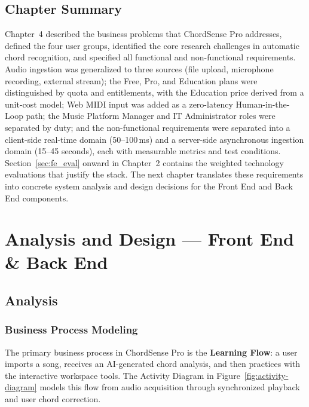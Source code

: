 \documentclass[a4paper]{article}
\begin{document}
\subsection{Chapter Summary}

Chapter~4 described the business problems that ChordSense Pro addresses, defined the four user groups, identified the core research challenges in automatic chord recognition, and specified all functional and non-functional requirements. Audio ingestion was generalized to three sources (file upload, microphone recording, external stream); the Free, Pro, and Education plans were distinguished by quota and entitlements, with the Education price derived from a unit-cost model; Web MIDI input was added as a zero-latency Human-in-the-Loop path; the Music Platform Manager and IT Administrator roles were separated by duty; and the non-functional requirements were separated into a client-side real-time domain (50--100\,ms) and a server-side asynchronous ingestion domain (15--45 seconds), each with measurable metrics and test conditions. Section~\ref{sec:fe_eval} onward in Chapter~2 contains the weighted technology evaluations that justify the stack. The next chapter translates these requirements into concrete system analysis and design decisions for the Front End and Back End components.

\newpage
\section{Analysis and Design --- Front End \& Back End}

\subsection{Analysis}

\subsubsection{Business Process Modeling}

The primary business process in ChordSense Pro is the \textbf{Learning Flow}: a user imports a song, receives an AI-generated chord analysis, and then practices with the interactive workspace tools. The Activity Diagram in Figure~\ref{fig:activity-diagram} models this flow from audio acquisition through synchronized playback and user chord correction.
\end{document}
